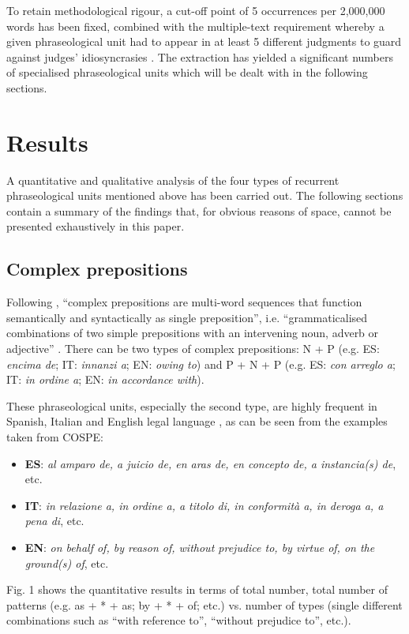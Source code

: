 \documentclass[output=paper]{LSP/langsci}
\begin{document}
To retain methodological rigour, a cut-off point of 5 occurrences per 2,000,000 words has been fixed, combined with the multiple-text requirement whereby a given phraseological unit had to appear in at least 5 different judgments to guard against judges’ idiosyncrasies \citep[110]{GozdzRoszkowski2011}.
The extraction has yielded a significant numbers of specialised phraseological units which will be dealt with in the following sections.

\section{Results}
A quantitative and qualitative analysis of the four types of recurrent phraseological units mentioned above has been carried out. The following sections contain a summary of the findings that, for obvious reasons of space, cannot be presented exhaustively in this paper.
\subsection{Complex prepositions}
Following \citet[75]{Biber1999}, “complex prepositions are multi-word sequences that function semantically and syntactically as single preposition”, i.e. “grammaticalised combinations of two simple prepositions with an intervening noun, adverb or adjective” \citep[44]{Granger2008}. There can be two types of complex prepositions: N + P (e.g. ES: \textit{encima de}; IT: \textit{innanzi a}; EN: \textit{owing to}) and P + N + P (e.g. ES: \textit{con arreglo a}; IT: \textit{in ordine a}; EN: \textit{in accordance with}).

These phraseological units, especially the second type, are highly frequent in Spanish, Italian and English legal language \citep[see][]{Pontrandolfo2013b}, as can be seen from the examples taken from COSPE:

\begin{itemize}
\item \textbf{ES}: \textit{al amparo de, a juicio de, en aras de, en concepto de, a instancia(s) de}, etc.
\item \textbf{IT}: \textit{in relazione a, in ordine a, a titolo di, in conformità a, in deroga a, a pena di}, etc.
\item \textbf{EN}: \textit{on behalf of, by reason of, without prejudice to, by virtue of, on the ground(s) of}, etc.
\end{itemize}

Fig. 1 shows the quantitative results in terms of total number, total number of patterns (e.g. as + * + as; by + * + of; etc.) vs. number of types (single different combinations such as “with reference to”, “without prejudice to”, etc.).
\end{document}
